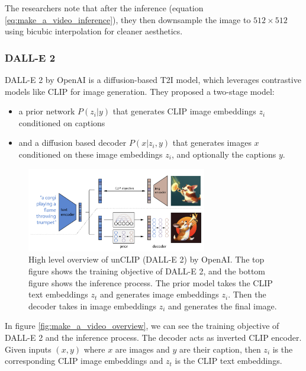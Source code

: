 The researchers note that after the inference (equation \ref{eq:make_a_video_inference}), they then downsample the image to $512\times 512$ using bicubic interpolation for cleaner aesthetics.







\subsubsection{DALL-E 2}
\label{sec:dalle_2}

DALL-E 2 by OpenAI \cite{dalle_2} is a diffusion-based T2I model, which leverages contrastive models like CLIP for image generation. They proposed a two-stage model: 

\begin{itemize}
    \item a prior network $P(z_i | y)$ that generates CLIP image embeddings $z_i$ conditioned on captions
    \item and a diffusion based decoder $P(x | z_i, y)$ that generates images $x$ conditioned on these image embeddings $z_i$, and optionally the captions $y$.
\end{itemize}

\begin{figure}
    \centering
    \includegraphics[width=0.7\textwidth]{images/make_a_video/dalle_2.png}
    \caption{High level overview of unCLIP (DALL-E 2) \cite{dalle_2} by OpenAI. The top figure shows the training objective of DALL-E 2, and the bottom figure shows the inference process. The prior model takes the CLIP text embeddings $z_t$ and generates image embeddings $z_i$. Then the decoder takes in image embeddings $z_i$ and generates the final image.}
    \label{fig:make_a_video_dalle2_overview}
\end{figure}

In figure \ref{fig:make_a_video_overview}, we can see the training objective of DALL-E 2 and the inference process. The decoder acts as inverted CLIP encoder. Given inputs $(x, y)$ where $x$ are images and $y$ are their caption, then $z_i$ is the corresponding CLIP image embeddings and $z_t$ is the CLIP text embeddings.

